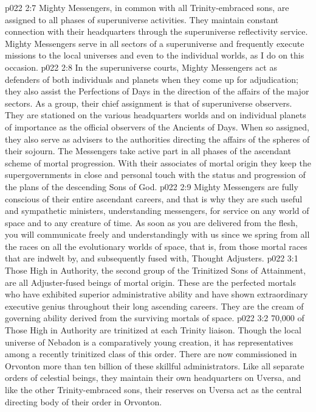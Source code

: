\vs p022 2:7 \pc Mighty Messengers, in common with all Trinity\hyp{}embraced sons, are assigned to all phases of superuniverse activities. They maintain constant connection with their headquarters through the superuniverse reflectivity service. Mighty Messengers serve in all sectors of a superuniverse and frequently execute missions to the local universes and even to the individual worlds, as I do on this occasion.
\vs p022 2:8 In the superuniverse courts, Mighty Messengers act as defenders of both individuals and planets when they come up for adjudication; they also assist the Perfections of Days in the direction of the affairs of the major sectors. As a group, their chief assignment is that of superuniverse observers. They are stationed on the various headquarters worlds and on individual planets of importance as the official observers of the Ancients of Days. When so assigned, they also serve as advisers to the authorities directing the affairs of the spheres of their sojourn. The Messengers take active part in all phases of the ascendant scheme of mortal progression. With their associates of mortal origin they keep the supergovernments in close and personal touch with the status and progression of the plans of the descending Sons of God.
\vs p022 2:9 Mighty Messengers are fully conscious of their entire ascendant careers, and that is why they are such useful and sympathetic ministers, understanding messengers, for service on any world of space and to any creature of time. As soon as you are delivered from the flesh, you will communicate freely and understandingly with us since we spring from all the races on all the evolutionary worlds of space, that is, from those mortal races that are indwelt by, and subsequently fused with, Thought Adjusters.
\vs p022 3:1 Those High in Authority, the second group of the Trinitized Sons of Attainment, are all Adjuster\hyp{}fused beings of mortal origin. These are the perfected mortals who have exhibited superior administrative ability and have shown extraordinary executive genius throughout their long ascending careers. They are the cream of governing ability derived from the surviving mortals of space.
\vs p022 3:2 70,000 of Those High in Authority are trinitized at each Trinity liaison. Though the local universe of Nebadon is a comparatively young creation, it has representatives among a recently trinitized class of this order. There are now commissioned in Orvonton more than ten billion of these skillful administrators. Like all separate orders of celestial beings, they maintain their own headquarters on Uversa, and like the other Trinity\hyp{}embraced sons, their reserves on Uversa act as the central directing body of their order in Orvonton.
